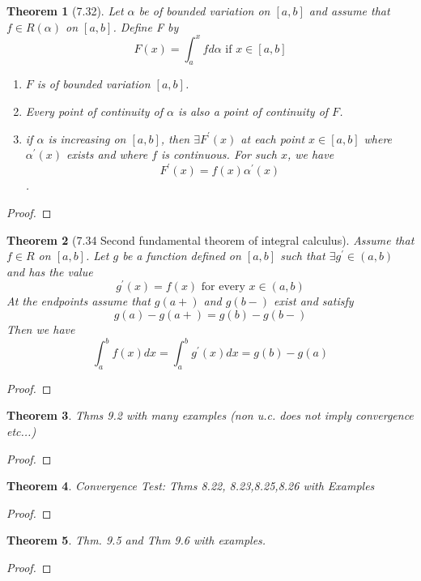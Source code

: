 \documentclass[aps,pra,notitlepage,amsmath,amssymb,letterpaper,12pt]{revtex4-1}
\newtheorem{theorem}{Theorem}
\begin{document}
\begin{theorem}[7.32]
Let $\alpha$ be of bounded variation on $[a,b]$ and assume that
$f \in R(\alpha)$ on $[a,b]$. Define F by
\[F(x)=\int_{a}^{x} f d \alpha \textrm{ if } x \in [a,b]\]
\begin{enumerate}[\upshape a)]
  \item $F$ is of bounded variation $[a,b]$.
  \item Every point of continuity of $\alpha$ is also a point of continuity of $F$.
  \item if $\alpha$ is increasing on $[a,b]$, then $\exists F^\prime(x)$ at each point $x \in [a,b]$ where $\alpha^\prime(x)$ exists and where $f$ is continuous. For such $x$, we have $$F^\prime(x) = f(x)\alpha^\prime(x)$$.
\end{enumerate}
\end{theorem}
\begin{proof}
\end{proof}

\begin{theorem}[7.34 Second fundamental theorem of integral calculus]
Assume that $f \in R$ on $[a,b]$. Let $g$ be a function defined on $[a,b]$ such that $\exists g^\prime \in (a,b)$ and has the value
\[g^\prime(x) = f(x) \textrm{ for every } x \in (a,b)\]
At the endpoints assume that $g(a+)$ and $g(b-)$ exist and satisfy
\[g(a) - g(a+) = g(b) - g(b-)\]
Then we have
\[\int_{a}^{b} f(x)dx = \int_{a}^{b} g^\prime(x)dx = g(b) - g(a)\]
\end{theorem}
\begin{proof}
\end{proof}

\begin{theorem}
Thms 9.2 with many examples (non u.c. does not imply convergence etc...)
\end{theorem}

\begin{proof}
\end{proof}

\begin{theorem}
Convergence Test: Thms 8.22, 8.23,8.25,8.26 with Examples
\end{theorem}

\begin{proof}
\end{proof}

\begin{theorem}
Thm. 9.5 and Thm 9.6 with examples.
\end{theorem}

\begin{proof}
\end{proof}
\end{document}
